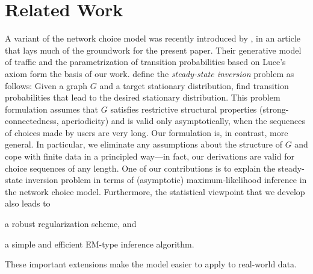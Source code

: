 \section{Related Work}  %
\label{sec:relwork}

A variant of the network choice model was recently introduced by \citet{kumar2015inverting}, in an article that lays much of the groundwork for the present paper.
Their generative model of traffic and the parametrization of transition probabilities based on Luce's axiom form the basis of our work.
\citeauthor{kumar2015inverting} define the \emph{steady-state inversion} problem as follows:
Given a graph $G$ and a target stationary distribution, find transition probabilities that lead to the desired stationary distribution.
This problem formulation assumes that $G$ satisfies restrictive structural properties (strong-connectedness, aperiodicity) and is valid only asymptotically, when the sequences of choices made by users are very long.
Our formulation is, in contrast, more general.
In particular, we eliminate any assumptions about the structure of $G$ and cope with finite data in a principled way---in fact, our derivations are valid for choice sequences of any length.
One of our contributions is to explain the steady-state inversion problem in terms of (asymptotic) maximum-likelihood inference in the network choice model.
Furthermore, the statistical viewpoint that we develop also leads to
\begin{enuminline}
\item a robust regularization scheme, and
\item a simple and efficient EM-type inference algorithm.
\end{enuminline}
These important extensions make the model easier to apply to real-world data.

